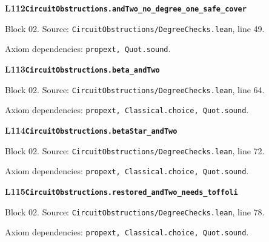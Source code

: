 \par\medskip
\begin{minipage}{\linewidth}
\hypertarget{L112}{}
{\small\sffamily\bfseries\color{ink}L112\quad\nolinkurl{CircuitObstructions.andTwo_no_degree_one_safe_cover}}\par
{\scriptsize\sffamily\color{muted}Block 02. Source: \nolinkurl{CircuitObstructions/DegreeChecks.lean}, line 49.}\par
{}
{\scriptsize\sffamily\color{muted}Axiom dependencies: \nolinkurl{propext, Quot.sound}.}
\end{minipage}\par\medskip
\begin{minipage}{\linewidth}
\hypertarget{L113}{}
{\small\sffamily\bfseries\color{ink}L113\quad\nolinkurl{CircuitObstructions.beta_andTwo}}\par
{\scriptsize\sffamily\color{muted}Block 02. Source: \nolinkurl{CircuitObstructions/DegreeChecks.lean}, line 64.}\par
{}
{\scriptsize\sffamily\color{muted}Axiom dependencies: \nolinkurl{propext, Classical.choice, Quot.sound}.}
\end{minipage}\par\medskip
\begin{minipage}{\linewidth}
\hypertarget{L114}{}
{\small\sffamily\bfseries\color{ink}L114\quad\nolinkurl{CircuitObstructions.betaStar_andTwo}}\par
{\scriptsize\sffamily\color{muted}Block 02. Source: \nolinkurl{CircuitObstructions/DegreeChecks.lean}, line 72.}\par
{}
{\scriptsize\sffamily\color{muted}Axiom dependencies: \nolinkurl{propext, Classical.choice, Quot.sound}.}
\end{minipage}\par\medskip
\begin{minipage}{\linewidth}
\hypertarget{L115}{}
{\small\sffamily\bfseries\color{ink}L115\quad\nolinkurl{CircuitObstructions.restored_andTwo_needs_toffoli}}\par
{\scriptsize\sffamily\color{muted}Block 02. Source: \nolinkurl{CircuitObstructions/DegreeChecks.lean}, line 78.}\par
{}
{\scriptsize\sffamily\color{muted}Axiom dependencies: \nolinkurl{propext, Classical.choice, Quot.sound}.}
\end{minipage}\par\medskip